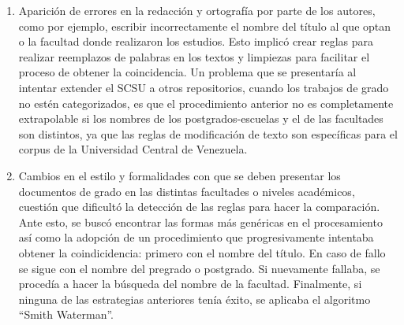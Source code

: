 \documentclass[
  12pt,
  openany]{book}
\begin{document}
\begin{enumerate}
\def\labelenumi{\arabic{enumi}.}
\item
  Aparición de errores en la redacción y ortografía por parte de los autores, como por ejemplo, escribir incorrectamente el nombre del título al que optan o la facultad donde realizaron los estudios. Esto implicó crear reglas para realizar reemplazos de palabras en los textos y limpiezas para facilitar el proceso de obtener la coincidencia. Un problema que se presentaría al intentar extender el SCSU a otros repositorios, cuando los trabajos de grado no estén categorizados, es que el procedimiento anterior no es completamente extrapolable si los nombres de los postgrados-escuelas y el de las facultades son distintos, ya que las reglas de modificación de texto son específicas para el corpus de la Universidad Central de Venezuela.
\item
  Cambios en el estilo y formalidades con que se deben presentar los documentos de grado en las distintas facultades o niveles académicos, cuestión que dificultó la detección de las reglas para hacer la comparación. Ante esto, se buscó encontrar las formas más genéricas en el procesamiento así como la adopción de un procedimiento que progresivamente intentaba obtener la coindicidencia: primero con el nombre del título. En caso de fallo se sigue con el nombre del pregrado o postgrado. Si nuevamente fallaba, se procedía a hacer la búsqueda del nombre de la facultad. Finalmente, si ninguna de las estrategias anteriores tenía éxito, se aplicaba el algoritmo ``Smith Waterman''.


\end{enumerate}
\end{document}
